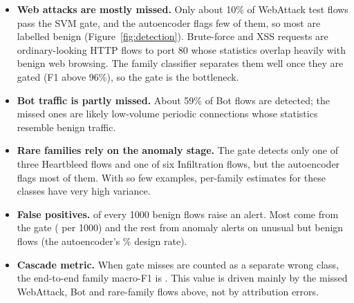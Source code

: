 \begin{itemize}
    \item \textbf{Web attacks are mostly missed.} Only about 10\% of WebAttack test flows pass the SVM gate, and the autoencoder flags few of them, so most are labelled benign (Figure~\ref{fig:detection}). Brute-force and XSS requests are ordinary-looking HTTP flows to port 80 whose statistics overlap heavily with benign web browsing. The family classifier separates them well once they are gated (F1 above 96\%), so the gate is the bottleneck.
    \item \textbf{Bot traffic is partly missed.} About 59\% of Bot flows are detected; the missed ones are likely low-volume periodic connections whose statistics resemble benign traffic.
    \item \textbf{Rare families rely on the anomaly stage.} The gate detects only one of three Heartbleed flows and one of six Infiltration flows, but the autoencoder flags most of them. With so few examples, per-family estimates for these classes have very high variance.
    \item \textbf{False positives.} \EoneFusionAlerts{} of every 1000 benign flows raise an alert. Most come from the gate (\EoneGateAlerts{} per 1000) and the rest from anomaly alerts on unusual but benign flows (the autoencoder's \EoneAeFpr\% design rate).
    \item \textbf{Cascade metric.} When gate misses are counted as a separate wrong class, the end-to-end family macro-F1 is \EoneCascadeMacroFone. This value is driven mainly by the missed WebAttack, Bot and rare-family flows above, not by attribution errors.
\end{itemize}
